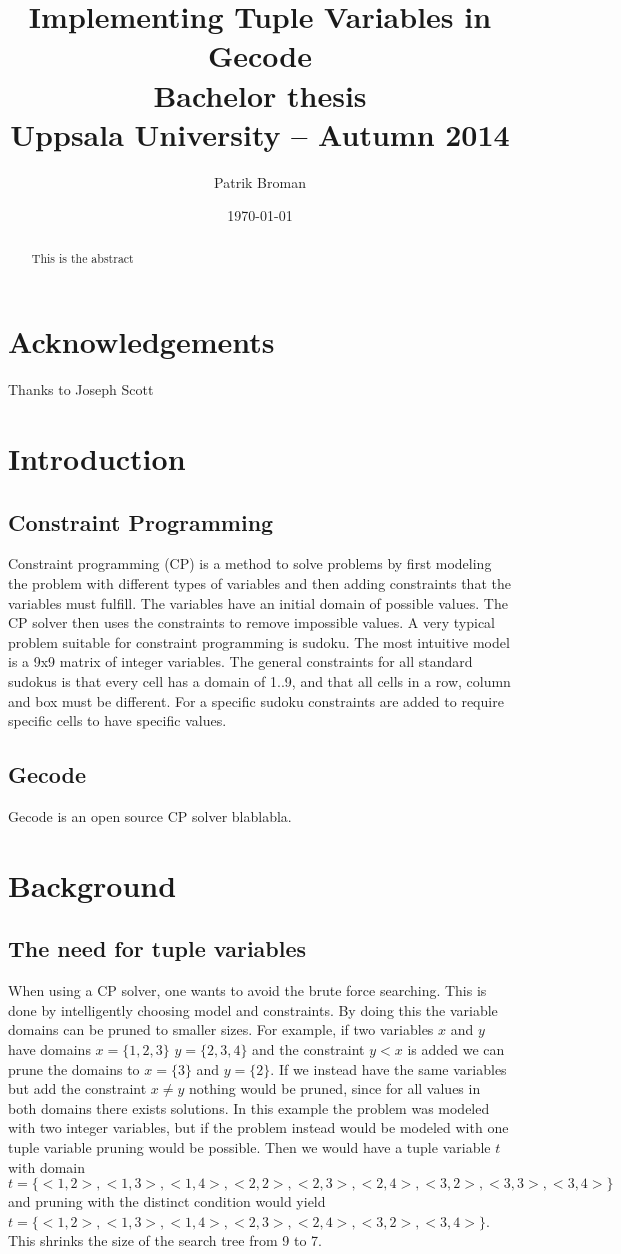 \documentclass[a4paper,11pt]{article}
\title{\textbf{Implementing Tuple Variables in Gecode \\
	Bachelor thesis \\
    Uppsala University -- Autumn 2014 \\
  }
}
\author{Patrik Broman}
\date{\today}
\begin{document}
\begin{abstract}
This is the abstract
\end{abstract}

\tableofcontents
\section{Acknowledgements}
Thanks to Joseph Scott
\section{Introduction}
\subsection{Constraint Programming}

Constraint programming (CP) is a method to solve problems by first modeling the problem with different types of variables and then adding constraints that the variables must fulfill. The variables have an initial domain of possible values. The CP solver then uses the constraints to remove impossible values. A very typical problem suitable for constraint programming is sudoku. The most intuitive model is a 9x9 matrix of integer variables. The general constraints for all standard sudokus is that every cell has a domain of 1..9, and that all cells in a row, column and box must be different. For a specific sudoku constraints are added to require specific cells to have specific values.

\subsection{Gecode}
Gecode is an open source CP solver blablabla.

\section{Background}
\subsection{The need for tuple variables}
When using a CP solver, one wants to avoid the brute force searching. This is done by intelligently choosing model and constraints. By doing this the variable domains can be pruned to smaller sizes. For example, if two variables $x$ and $y$ have domains $x=\{1,2,3\}$ $y=\{2,3,4\}$ and the constraint $y<x$ is added we can prune the domains to $x=\{3\}$ and $y=\{2\}$. If we instead have the same variables but add the constraint $x\neq y$ nothing would be pruned, since for all values in both domains there exists solutions. In this example the problem was modeled with two integer variables, but if the problem instead would be modeled with one tuple variable pruning would be possible. Then we would have a tuple variable $t$ with domain $t=\{<1,2>,<1,3>,<1,4>,<2,2>,<2,3>,<2,4>,<3,2>,<3,3>,<3,4>\}$ and pruning with the distinct condition would yield $t=\{<1,2>,<1,3>,<1,4>,<2,3>,<2,4>,<3,2>,<3,4>\}$. This shrinks the size of the search tree from 9 to 7. 
\end{document}
